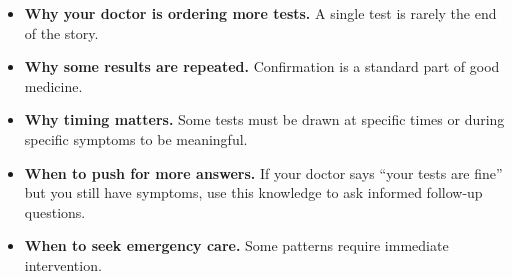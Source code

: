\begin{itemize}
    \item \textbf{Why your doctor is ordering more tests.} A single test is rarely the end of the story.
    \item \textbf{Why some results are repeated.} Confirmation is a standard part of good medicine.
    \item \textbf{Why timing matters.} Some tests must be drawn at specific times or during specific symptoms to be meaningful.
    \item \textbf{When to push for more answers.} If your doctor says ``your tests are fine'' but you still have symptoms, use this knowledge to ask informed follow-up questions.
    \item \textbf{When to seek emergency care.} Some patterns require immediate intervention.
\end{itemize}
